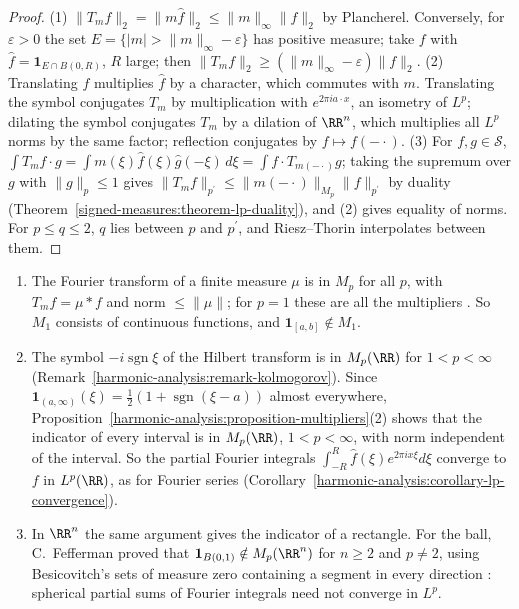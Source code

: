 \begin{proof}
(1) $\|T_mf\|_2 = \|m\hat f\|_2 \leq \|m\|_\infty\|f\|_2$ by Plancherel. Conversely, for $\varepsilon > 0$ the set $E = \{|m| > \|m\|_\infty - \varepsilon\}$ has positive measure; take $f$ with $\hat f = \mathbf{1}_{E \cap B(0,R)}$, $R$
large; then $\|T_mf\|_2 \geq (\|m\|_\infty - \varepsilon)\|f\|_2$. (2) Translating $f$ multiplies $\hat f$ by a character, which commutes with $m$. Translating the symbol conjugates $T_m$ by multiplication with $e^{2\pi ia\cdot x}$, an
isometry of $L^p$; dilating the symbol conjugates $T_m$ by a dilation of $\RR^n$, which multiplies all $L^p$ norms by the same factor; reflection conjugates by $f \mapsto f(-\cdot)$. (3) For $f, g \in \mathcal{S}$,
$\int T_mf\cdot g = \int m(\xi)\hat f(\xi)\hat g(-\xi)\,d\xi = \int f\cdot T_{m(-\cdot)}g$; taking the supremum over $g$ with $\|g\|_p \leq 1$ gives $\|T_mf\|_{p^{\prime}} \leq \|m(-\cdot)\|_{M_p}\|f\|_{p^{\prime}}$ by duality
(Theorem~\ref{signed-measures:theorem-lp-duality}), and (2) gives equality of norms. For $p \leq q \leq 2$, $q$ lies between $p$ and $p^{\prime}$, and Riesz--Thorin interpolates between them.
\end{proof}

\begin{example}\label{harmonic-analysis:example-multipliers}
\begin{enumerate}
\item The Fourier transform of a finite measure $\mu$ is in $M_p$ for all $p$, with $T_mf = \mu * f$ and norm $\leq \|\mu\|$; for $p = 1$ these are all the multipliers \cite{grafakos-classical}. So $M_1$ consists of continuous
functions, and $\mathbf{1}_{[a,b]} \notin M_1$.
\item The symbol $-i\operatorname{sgn}\xi$ of the Hilbert transform is in $M_p(\RR)$ for $1 < p < \infty$ (Remark~\ref{harmonic-analysis:remark-kolmogorov}). Since $\mathbf{1}_{(a,\infty)}(\xi) = \frac12(1 + \operatorname{sgn}(\xi - a))$ almost
everywhere, Proposition~\ref{harmonic-analysis:proposition-multipliers}(2) shows that the indicator of every interval is in $M_p(\RR)$, $1 < p < \infty$, with norm independent of the interval. So the partial Fourier integrals
$\int_{-R}^R\hat f(\xi)e^{2\pi ix\xi}d\xi$ converge to $f$ in $L^p(\RR)$, as for Fourier series (Corollary~\ref{harmonic-analysis:corollary-lp-convergence}).
\item In $\RR^n$ the same argument gives the indicator of a rectangle. For the ball, C.\ Fefferman proved that $\mathbf{1}_{B(0,1)} \notin M_p(\RR^n)$ for $n \geq 2$ and $p \neq 2$, using Besicovitch's sets of measure zero
containing a segment in every direction \cite{fefferman-1971-ball}: spherical partial sums of Fourier integrals need not converge in $L^p$.
\end{enumerate}
\end{example}

